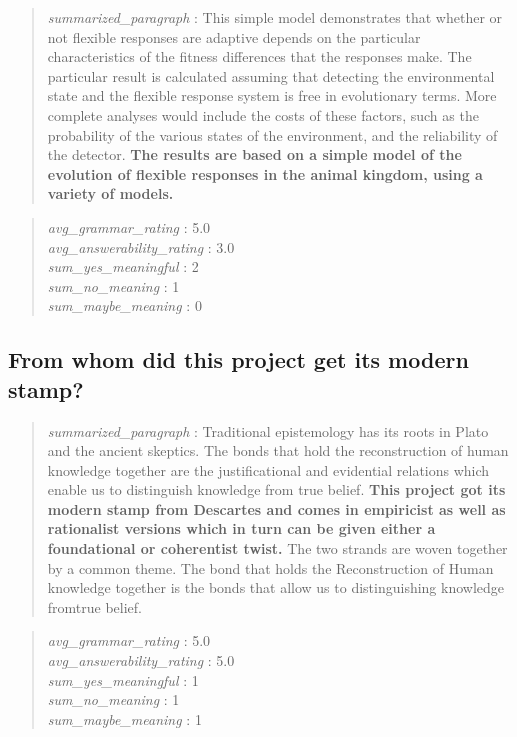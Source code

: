\begin{quote}
\emph{summarized\_paragraph} : This simple model demonstrates that
whether or not flexible responses are adaptive depends on the particular
characteristics of the fitness differences that the responses make. The
particular result is calculated assuming that detecting the
environmental state and the flexible response system is free in
evolutionary terms. More complete analyses would include the costs of
these factors, such as the probability of the various states of the
environment, and the reliability of the detector. \textbf{The results
are based on a simple model of the evolution of flexible responses in
the animal kingdom, using a variety of models.}
\end{quote}

\begin{quote}
\emph{avg\_grammar\_rating} : 5.0\\
\emph{avg\_answerability\_rating} : 3.0\\
\emph{sum\_yes\_meaningful} : 2\\
\emph{sum\_no\_meaning} : 1\\
\emph{sum\_maybe\_meaning} : 0
\end{quote}

\hypertarget{from-whom-did-this-project-get-its-modern-stamp}{%
\subsection{From whom did this project get its modern
stamp?}\label{from-whom-did-this-project-get-its-modern-stamp}}

\begin{quote}
\emph{summarized\_paragraph} : Traditional epistemology has its roots in
Plato and the ancient skeptics. The bonds that hold the reconstruction
of human knowledge together are the justificational and evidential
relations which enable us to distinguish knowledge from true belief.
\textbf{This project got its modern stamp from Descartes and comes in
empiricist as well as rationalist versions which in turn can be given
either a foundational or coherentist twist.} The two strands are woven
together by a common theme. The bond that holds the Reconstruction of
Human knowledge together is the bonds that allow us to distinguishing
knowledge fromtrue belief.
\end{quote}

\begin{quote}
\emph{avg\_grammar\_rating} : 5.0\\
\emph{avg\_answerability\_rating} : 5.0\\
\emph{sum\_yes\_meaningful} : 1\\
\emph{sum\_no\_meaning} : 1\\
\emph{sum\_maybe\_meaning} : 1
\end{quote}
